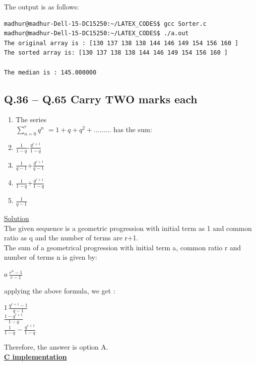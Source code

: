 \documentclass{article}
\begin{document}
\noindent The output is as follows:\medskip\\
\begin{lstlisting}[style=terminal]
madhur@madhur-Dell-15-DC15250:~/LATEX_CODES$ gcc Sorter.c
madhur@madhur-Dell-15-DC15250:~/LATEX_CODES$ ./a.out
The original array is : [130 137 138 138 144 146 149 154 156 160 ]
The sorted array is: [130 137 138 138 144 146 149 154 156 160 ]

The median is : 145.000000

\end{lstlisting}
\subsection*{Q.36 – Q.65 Carry TWO marks each}

\hfill\begin{minipage}{\linewidth}
    \begin{enumerate}
    \item[Q.36] The series \\ $\sum_{n=0}^{r} q^n$ $=1+q+q^2+... ... ...$ has the sum:
    \item[(A)] $\frac{1}{1-q}$-$\frac{q^{r+1}}{1-q}$
    \item[(B)] $\frac{1}{q-1}$+$\frac{q^{r+1}}{q-1}$
    \item[(C)] $\frac{1}{1-q}$+$\frac{q^{r+1}}{1-q}$
    \item[(D)] $\frac{1}{q-1}$
    \end{enumerate}
\end{minipage}
\underline{Solution}\medskip\\
    The given sequence is a geometric progression with initial term as 1 and common ratio as q and the number of terms are r+1.\\
    The sum of a geometrical progression with initial term a, common ratio r and number of terms n is given by:\\
    \begin{center}
        \large$a\,\frac{r^n-1}{r-1}$
    \end{center}
    applying the above formula, we get :
    \begin{center}
        $1\,\frac{q^{r+1}-1}{q-1}$\medskip\\
        $\frac{1-q^{r+1}}{1-q}$\medskip\\
        $\frac{1}{1-q}-\frac{q^{r+1}}{1-q}$
        
    \end{center}
Therefore, the answer is option A.\medskip\\
\large\underline{\textbf{C implementation}}\\
\end{document}
